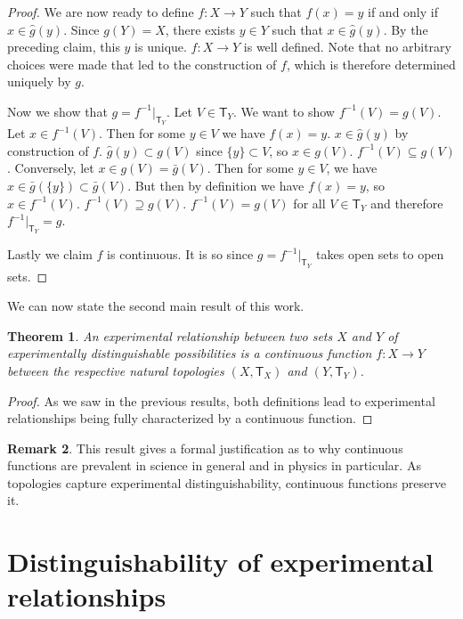 \documentclass{amsart}
\newtheorem{thm}{Theorem}[section]
\theoremstyle{definition}
\newtheorem{rem}[thm]{Remark}
\numberwithin{equation}{section}
\begin{document}
\begin{proof}
	We are now ready to define $f: X\to Y$ such that $f(x) = y$ if and only if $x\in \hat{g}(y)$. Since $g(Y)=X$, there exists $y\in Y$ such that $x\in\hat{g}(y)$. By the preceding claim, this $y$ is unique. $f: X\to Y$ is well defined. Note that no arbitrary choices were made that led to the construction of $f$, which is therefore determined uniquely by $g$. 
	
	Now we show that $g = f^{-1} |_{\mathsf{T}_Y}$. Let $V\in\mathsf{T}_Y$. We want to show $f^{-1}(V) = g(V)$. Let $x\in f^{-1}(V)$. Then for some $y \in V$ we have $f(x)=y$. $x\in \hat{g}(y)$ by construction of $f$. $\hat{g}(y) \subset g(V)$ since $\{y\}\subset V$, so $x\in g(V)$. $f^{-1}(V) \subseteq g(V)$. Conversely, let $x\in g(V)=\bar{g}(V)$. Then for some $y\in V$, we have $x\in\bar{g}(\{y\})\subset\bar{g}(V)$. But then by definition we have $f(x)=y$, so $x\in f^{-1}(V)$. $f^{-1}(V) \supseteq g(V)$. $f^{-1}(V) = g(V)$ for all $V\in\mathsf{T}_Y$ and therefore $f^{-1}|_{\mathsf{T}_Y}=g$.
	
	Lastly we claim $f$ is continuous. It is so since $g = f^{-1} |_{\mathsf{T}_Y}$ takes open sets to open sets. 
\end{proof}

We can now state the second main result of this work.

\begin{thm}
	An experimental relationship between two sets $X$ and $Y$ of experimentally distinguishable possibilities is a continuous function $f : X \rightarrow Y$ between the respective natural topologies $(X,\mathsf{T}_X)$ and $(Y,\mathsf{T}_Y)$. 
\end{thm}

\begin{proof}
	As we saw in the previous results, both definitions lead to experimental relationships being fully characterized by a continuous function.
\end{proof}

\begin{rem}
	This result gives a formal justification as to why continuous functions are prevalent in science in general and in physics in particular. As topologies capture experimental distinguishability, continuous functions preserve it.
\end{rem}


\section{\bf Distinguishability of experimental relationships}
\end{document}
